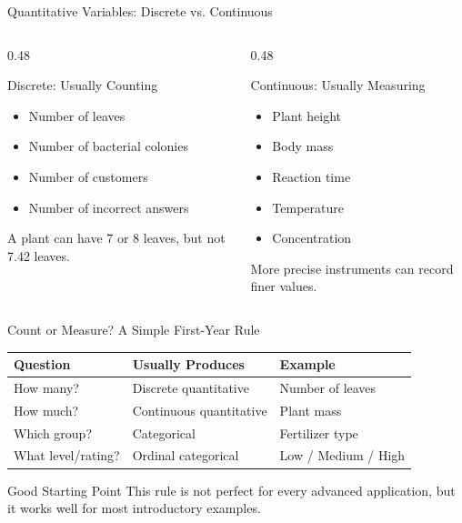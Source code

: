 \documentclass[aspectratio=169]{beamer}
\begin{document}
\begin{frame}{Quantitative Variables: Discrete vs. Continuous}
  \begin{columns}[T]
    \begin{column}{0.48\textwidth}
      \begin{block}{Discrete: Usually Counting}
        \begin{itemize}
          \item Number of leaves
          \item Number of bacterial colonies
          \item Number of customers
          \item Number of incorrect answers
        \end{itemize}
        A plant can have 7 or 8 leaves, but not 7.42 leaves.
      \end{block}
    \end{column}
    \begin{column}{0.48\textwidth}
      \begin{block}{Continuous: Usually Measuring}
        \begin{itemize}
          \item Plant height
          \item Body mass
          \item Reaction time
          \item Temperature
          \item Concentration
        \end{itemize}
        More precise instruments can record finer values.
      \end{block}
    \end{column}
  \end{columns}
\end{frame}

\begin{frame}{Count or Measure? A Simple First-Year Rule}
  \begin{table}
    \centering
    \begin{tabular}{lll}
      \toprule
      \textbf{Question} & \textbf{Usually Produces} & \textbf{Example} \\
      \midrule
      How many? & Discrete quantitative & Number of leaves \\
      How much? & Continuous quantitative & Plant mass \\
      Which group? & Categorical & Fertilizer type \\
      What level/rating? & Ordinal categorical & Low / Medium / High \\
      \bottomrule
    \end{tabular}
  \end{table}
  \vspace{0.25cm}
  \begin{block}{Good Starting Point}
    This rule is not perfect for every advanced application, but it works well for most introductory examples.
  \end{block}
\end{frame}
\end{document}
